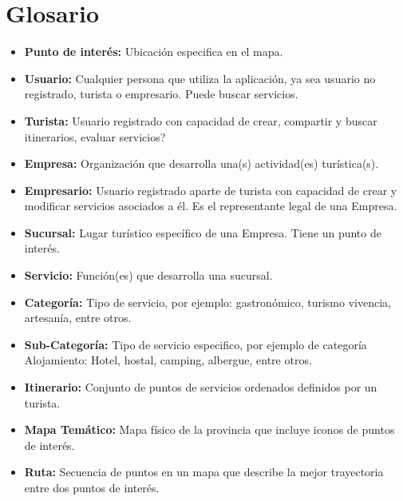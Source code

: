 \documentclass[12pt]{article}
\begin{document}
\section{Glosario}
\begin{itemize}
\item \textbf{Punto de interés:} Ubicación especifica en el mapa. 

\item \textbf{Usuario:} Cualquier persona que utiliza la aplicación, ya sea usuario no registrado, turista o empresario. Puede buscar servicios.

\item \textbf{Turista:} Usuario registrado con capacidad de crear, compartir y buscar itinerarios, evaluar servicios? 

\item \textbf{Empresa:} Organización que desarrolla una(s) actividad(es)  turística(s).

\item \textbf{Empresario:} Usuario registrado aparte de turista con capacidad de crear y modificar servicios asociados a él. Es el representante legal de una Empresa.

\item \textbf{Sucursal:} Lugar turístico específico de una Empresa. Tiene un punto de interés.

\item \textbf{Servicio:} Función(es) que desarrolla una sucursal. 

\item \textbf{Categoría:} Tipo de servicio, por ejemplo: gastronómico, turismo vivencia, artesanía, entre otros.

\item \textbf{Sub-Categoría:} Tipo de servicio especifico, por ejemplo de categoría Alojamiento: Hotel, hostal, camping, albergue, entre otros. 

\item \textbf{Itinerario:} Conjunto de puntos de servicios ordenados definidos por un turista.

\item \textbf{Mapa Temático:} Mapa físico de la provincia que incluye iconos de puntos de interés.

\item \textbf{Ruta:} Secuencia de puntos en un mapa que describe la mejor trayectoria entre dos puntos de interés.

\end{itemize}
\end{document}
